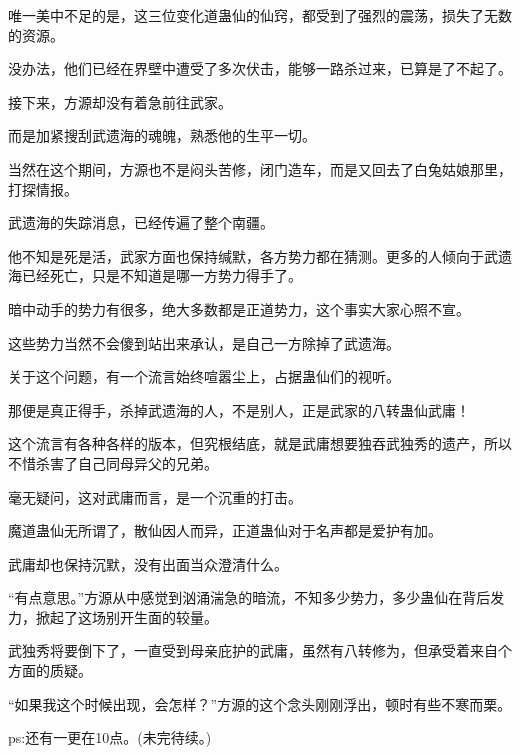 \begin{this_body}
唯一美中不足的是，这三位变化道蛊仙的仙窍，都受到了强烈的震荡，损失了无数的资源。

没办法，他们已经在界壁中遭受了多次伏击，能够一路杀过来，已算是了不起了。

接下来，方源却没有着急前往武家。

而是加紧搜刮武遗海的魂魄，熟悉他的生平一切。

当然在这个期间，方源也不是闷头苦修，闭门造车，而是又回去了白兔姑娘那里，打探情报。

武遗海的失踪消息，已经传遍了整个南疆。

他不知是死是活，武家方面也保持缄默，各方势力都在猜测。更多的人倾向于武遗海已经死亡，只是不知道是哪一方势力得手了。

暗中动手的势力有很多，绝大多数都是正道势力，这个事实大家心照不宣。

这些势力当然不会傻到站出来承认，是自己一方除掉了武遗海。

关于这个问题，有一个流言始终喧嚣尘上，占据蛊仙们的视听。

那便是真正得手，杀掉武遗海的人，不是别人，正是武家的八转蛊仙武庸！

这个流言有各种各样的版本，但究根结底，就是武庸想要独吞武独秀的遗产，所以不惜杀害了自己同母异父的兄弟。

毫无疑问，这对武庸而言，是一个沉重的打击。

魔道蛊仙无所谓了，散仙因人而异，正道蛊仙对于名声都是爱护有加。

武庸却也保持沉默，没有出面当众澄清什么。

“有点意思。”方源从中感觉到汹涌湍急的暗流，不知多少势力，多少蛊仙在背后发力，掀起了这场别开生面的较量。

武独秀将要倒下了，一直受到母亲庇护的武庸，虽然有八转修为，但承受着来自个方面的质疑。

“如果我这个时候出现，会怎样？”方源的这个念头刚刚浮出，顿时有些不寒而栗。

ps:还有一更在10点。(未完待续。)

\end{this_body}

